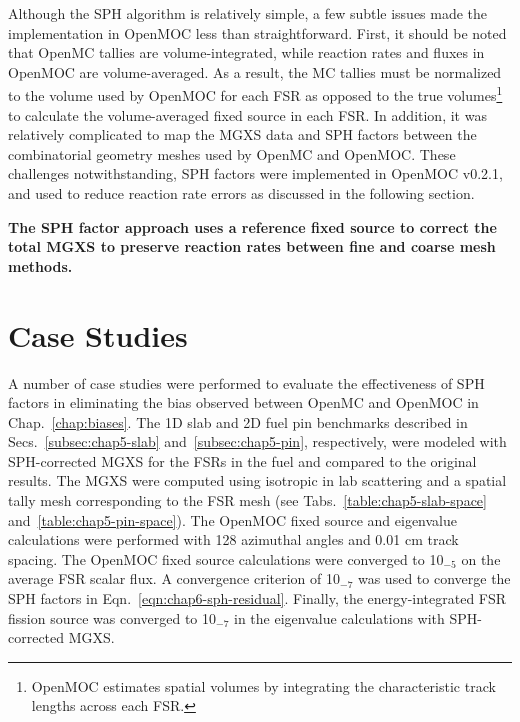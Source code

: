 Although the \ac{SPH} algorithm is relatively simple, a few subtle issues made the implementation in OpenMOC less than straightforward. First, it should be noted that OpenMC tallies are volume-integrated, while reaction rates and fluxes in OpenMOC are volume-averaged. As a result, the \ac{MC} tallies must be normalized to the volume used by OpenMOC for each \ac{FSR} as opposed to the true volumes\footnote{OpenMOC estimates spatial volumes by integrating the characteristic track lengths across each \ac{FSR}.} to calculate the volume-averaged fixed source in each \ac{FSR}. In addition, it was relatively complicated to map the \ac{MGXS} data and \ac{SPH} factors between the combinatorial geometry meshes used by OpenMC and OpenMOC. These challenges notwithstanding, \ac{SPH} factors were implemented in OpenMOC v0.2.1, and used to reduce reaction rate errors as discussed in the following section.

\begin{emphbox}
\textbf{The \ac{SPH} factor approach uses a reference fixed source to correct the total \ac{MGXS} to preserve reaction rates between fine and coarse mesh methods.}
\end{emphbox}

\section{Case Studies}
\label{sec:chap6-sph-case-studies}

A number of case studies were performed to evaluate the effectiveness of \ac{SPH} factors in eliminating the bias observed between OpenMC and OpenMOC in Chap.~\ref{chap:biases}. The 1D slab and 2D fuel pin benchmarks described in Secs.~\ref{subsec:chap5-slab} and~\ref{subsec:chap5-pin}, respectively, were modeled with \ac{SPH}-corrected \ac{MGXS} for the \ac{FSR}s in the fuel and compared to the original results. The \ac{MGXS} were computed using isotropic in lab scattering and a spatial tally mesh corresponding to the \ac{FSR} mesh (see Tabs.~\ref{table:chap5-slab-space} and~\ref{table:chap5-pin-space}). The OpenMOC fixed source and eigenvalue calculations were performed with 128 azimuthal angles and 0.01 cm track spacing. The OpenMOC fixed source calculations were converged to 10$_{-5}$ on the average \ac{FSR} scalar flux. A convergence criterion of 10$_{-7}$ was used to converge the \ac{SPH} factors in Eqn.~\ref{eqn:chap6-sph-residual}. Finally, the energy-integrated \ac{FSR} fission source was converged to 10$_{-7}$ in the eigenvalue calculations with \ac{SPH}-corrected \ac{MGXS}.

